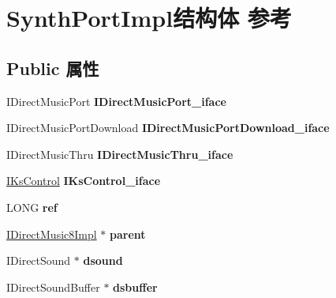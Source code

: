 \hypertarget{struct_synth_port_impl}{}\section{Synth\+Port\+Impl结构体 参考}
\label{struct_synth_port_impl}
\subsection*{Public 属性}
\begin{DoxyCompactItemize}
\item 
\mbox{\label{struct_synth_port_impl_a6a30a48e0bed99241b795a878fb73f3f}} 
I\+Direct\+Music\+Port {\bfseries I\+Direct\+Music\+Port\+\_\+iface}
\item 
\mbox{\label{struct_synth_port_impl_a04ea6360d5dd0c2c50009f6be5581242}} 
I\+Direct\+Music\+Port\+Download {\bfseries I\+Direct\+Music\+Port\+Download\+\_\+iface}
\item 
\mbox{\label{struct_synth_port_impl_a1eef7410555f3d130307ab1c7b15a9c2}} 
I\+Direct\+Music\+Thru {\bfseries I\+Direct\+Music\+Thru\+\_\+iface}
\item 
\mbox{\label{struct_synth_port_impl_a4deb3ed31ae33aed0d267010e6f4bfc9}} 
\hyperlink{interface_i_ks_control}{I\+Ks\+Control} {\bfseries I\+Ks\+Control\+\_\+iface}
\item 
\mbox{\label{struct_synth_port_impl_a62495aea422dbc04a8d9659c1686265a}} 
L\+O\+NG {\bfseries ref}
\item 
\mbox{\label{struct_synth_port_impl_abb1bf558797e0d972bc5c4fdd359613f}} 
\hyperlink{struct_i_direct_music8_impl}{I\+Direct\+Music8\+Impl} $\ast$ {\bfseries parent}
\item 
\mbox{\label{struct_synth_port_impl_a336609a9798b873fdd55145e87877606}} 
I\+Direct\+Sound $\ast$ {\bfseries dsound}
\item 
\mbox{\label{struct_synth_port_impl_a19d12d23825b383d9cb3f8ee06b693aa}} 
I\+Direct\+Sound\+Buffer $\ast$ {\bfseries dsbuffer}

\end{DoxyCompactItemize}
